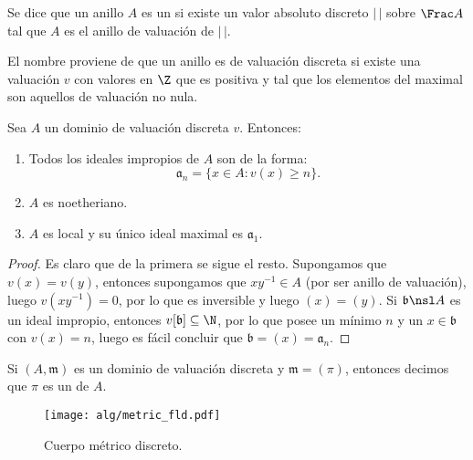 \documentclass[teoria-numeros.tex]{subfiles}
\begin{document}
\begin{mydefi}
	Se dice que un anillo $A$ es un  si existe un valor absoluto discreto
	$|\,|$ sobre $\Frac A$ tal que $A$ es el anillo de valuación de $|\,|$.
\end{mydefi}
El nombre proviene de que un anillo es de valuación discreta si existe una valuación $v$ con valores en $\Z$ que es positiva y
tal que los elementos del maximal son aquellos de valuación no nula.
\begin{cor}
	Sea $A$ un dominio de valuación discreta $v$.
	Entonces:
	\begin{enumerate}
		\item Todos los ideales impropios de $A$ son de la forma:
			$$ \mathfrak{a}_n = \{ x \in A : v(x) \ge n \}. $$
		\item $A$ es noetheriano.
		\item $A$ es local y su único ideal maximal es $\mathfrak{a}_1$.
	\end{enumerate}
\end{cor}
\begin{proof}
	Es claro que de la primera se sigue el resto.
	Supongamos que $v(x) = v(y)$, entonces supongamos que $xy^{-1} \in A$ (por ser anillo de valuación), luego $v(xy^{-1}) = 0$,
	por lo que es inversible y luego $(x) = (y)$.
	Si $\mathfrak{b} \nsl A$ es un ideal impropio, entonces $v[ \mathfrak{b} ] \subseteq \N$, por lo que posee un mínimo $n$
	y un $x \in \mathfrak{b}$ con $v(x) = n$, luego es fácil concluir que $\mathfrak{b} = (x) = \mathfrak{a}_n$.
\end{proof}

\begin{mydefi}
	Si $(A, \mathfrak{m})$ es un dominio de valuación discreta y $\mathfrak{m} = (\pi)$, entonces decimos que $\pi$ es
	un  de $A$.
\end{mydefi}
\begin{figure}[!hbt]
	\centering
	\texttt{[image: alg/metric\_fld.pdf]}
	\caption{Cuerpo métrico discreto.}%
	\label{fig:alg/metric_fld}
\end{figure}
\end{document}
